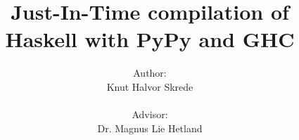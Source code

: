 \documentclass[12pt,a4paper]{book}
\begin{document}
%

\title{Just-In-Time compilation of\\Haskell with PyPy and GHC}
\author{Author:\\
Knut Halvor Skrede\\
\\
Advisor:
\\
Dr. Magnus Lie Hetland}


\begin{titlepage}
\maketitle
\end{titlepage}


\clearpage

\clearpage

\setcounter{tocdepth}{2}
\tableofcontents
\clearpage

\pagestyle{plain}
\setcounter{page}{1}



%




%
%





%

\clearpage



\clearpage
\appendix
\appendixpage



\end{document}
